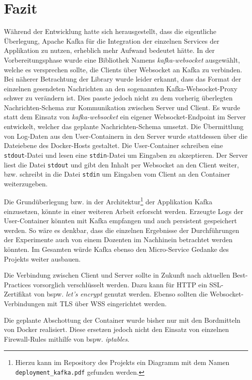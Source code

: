 \chapter{Fazit}
Während der Entwicklung hatte sich herausgestellt, dass die eigentliche Überlegung, Apache Kafka für die Integration der einzelnen Services der Applikation zu nutzen, erheblich mehr Aufwand bedeutet hätte.
In der Vorbereitungsphase wurde eine Bibliothek Namens \textit{kafka-websocket} ausgewählt, welche es versprechen sollte, die Clients über Websocket an Kafka zu verbinden.
Bei näherer Betrachtung der Library wurde leider erkannt, dass das Format der einzelnen gesendeten Nachrichten an den sogenannten Kafka-Websocket-Proxy schwer zu verändern ist.
Dies passte jedoch nicht zu dem vorherig überlegten Nachrichten-Schema zur Kommunikation zwischen Server und Client.
Es wurde statt dem Einsatz von \textit{kafka-websocket} ein eigener Websocket-Endpoint im Server entwickelt, welcher das geplante Nachrichten-Schema umsetzt.
Die Übermittlung von Log-Daten aus den User-Containern in den Server wurde stattdessen über die Dateiebene des Docker-Hosts gestaltet.
Die User-Container schreiben eine \texttt{stdout}-Datei und lesen eine \texttt{stdin}-Datei um Eingaben zu akzeptieren.
Der Server liest die Datei \texttt{stdout} und gibt den Inhalt per Websocket an den Client weiter, bzw. schreibt in die Datei \texttt{stdin} um Eingaben vom Client an den Container weiterzugeben.
\par
Die Grundüberlegung bzw. in der Architektur\footnote{Hierzu kann im Repository des Projekts ein Diagramm mit dem Namen \texttt{deployment\_kafka.pdf} gefunden werden.} der Applikation Kafka einzusetzen, könnte in einer weiteren Arbeit erforscht werden.
Erzeugte Logs der User-Container könnten mit Kafka empfangen und auch persistent gespeichert werden.
So wäre es denkbar, dass die einzelnen Ergebnisse der Durchführungen der Experimente auch von einem Dozenten im Nachhinein betrachtet werden könnten.
Im Gesamten würde Kafka ebenso den Micro-Service Gedanke des Projekts weiter ausbauen.
\par
Die Verbindung zwischen Client und Server sollte in Zukunft nach aktuellen Best-Practices vorsorglich verschlüsselt werden.
Dazu kann für HTTP ein SSL-Zertifikat von \ac{bspw.} \textit{let's encrypt} genutzt werden.
Ebenso sollten die Websocket-Verbindungen mit TLS über WSS eingerichtet werden.
\par
Die geplante Abschottung der Container wurde bisher nur mit den Bordmitteln von Docker realisiert.
Diese ersetzen jedoch nicht den Einsatz von einzelnen Firewall-Rules mithilfe von \ac{bspw.} \textit{iptables}.
